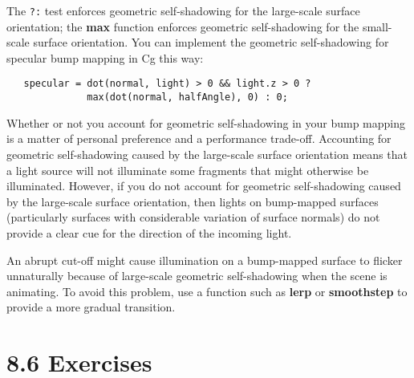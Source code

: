\documentclass[../main.tex]{subfiles}
\begin{document}
The \verb!?:! test enforces geometric self-shadowing for the large-scale surface orientation; the \textbf{max} function enforces geometric self-shadowing for the small-scale surface orientation. You can implement the geometric self-shadowing for specular bump mapping in Cg this way:

\FloatBarrier
\begin{lstlisting}
   specular = dot(normal, light) > 0 && light.z > 0 ?
              max(dot(normal, halfAngle), 0) : 0;
\end{lstlisting}
\FloatBarrier

Whether or not you account for geometric self-shadowing in your bump mapping is a matter of personal preference and a performance trade-off. Accounting for geometric self-shadowing caused by the large-scale surface orientation means that a light source will not illuminate some fragments that might otherwise be illuminated. However, if you do not account for geometric self-shadowing caused by the large-scale surface orientation, then lights on bump-mapped surfaces (particularly surfaces with considerable variation of surface normals) do not provide a clear cue for the direction of the incoming light.

An abrupt cut-off might cause illumination on a bump-mapped surface to flicker unnaturally because of large-scale geometric self-shadowing when the scene is animating. To avoid this problem, use a function such as \textbf{lerp} or \textbf{smoothstep} to provide a more gradual transition.

\section{8.6 Exercises}
\end{document}
